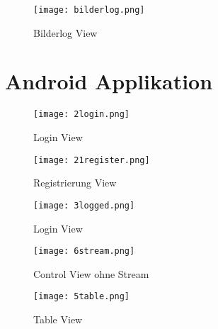 \begin{figure}[ht]
  \begin{center}
    \texttt{[image: bilderlog.png]}
  		  \caption{Bilderlog View}
  \end{center}
\end{figure}


\newpage
\section{Android Applikation}\label{A.android}


\begin{figure}[h]
\begin{minipage}[h]{8cm}
	\centering
	\texttt{[image: 2login.png]}
	\caption{Login View}
\end{minipage}
\hfill
\begin{minipage}[h]{8cm}
	\centering
	\texttt{[image: 21register.png]}
	\caption{Registrierung View}
\end{minipage}
\end{figure}


\begin{figure}[h]
\begin{minipage}[h]{8cm}
	\centering
	\texttt{[image: 3logged.png]}
	\caption{Login View}
\end{minipage}
\hfill
\begin{minipage}[h]{8cm}
	\centering
	\texttt{[image: 6stream.png]}
	\caption{Control View ohne Stream}
\end{minipage}
\end{figure}


\begin{figure}[ht]
  \begin{center}
    \texttt{[image: 5table.png]}
  		  \caption{Table View}
  \end{center}
\end{figure}



